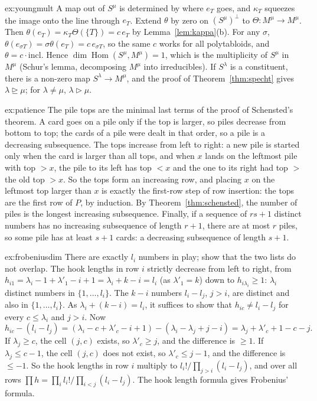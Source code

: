 \begin{solution}{ex:youngmult}
\idea A map out of $S^\mu$ is determined by where $e_T$ goes, and $\kappa_T$ squeezes the image onto the line through $e_T$.
\writeup Extend $\theta$ by zero on $(S^\mu)^\perp$ to $\Theta:M^\mu\to M^\mu$. Then $\theta(e_T)=\kappa_T\Theta(\{T\})=c\,e_T$ by Lemma~\ref{lem:kappa}(b). For any $\sigma$, $\theta(e_{\sigma T})=\sigma\theta(e_T)=c\,e_{\sigma T}$, so the same $c$ works for all
polytabloids, and $\theta=c\cdot\mathrm{incl}$. Hence $\dim\operatorname{Hom}(S^\mu,M^\mu)=1$, which is the multiplicity of $S^\mu$ in $M^\mu$ (Schur's lemma, decomposing $M^\mu$ into irreducibles). If $S^\lambda$ is a constituent, there is a non-zero
map $S^\lambda\to M^\mu$, and the proof of Theorem~\ref{thm:specht} gives $\lambda\trianglerighteq\mu$; for $\lambda\ne\mu$, $\lambda\triangleright\mu$.
\end{solution}

\begin{solution}{ex:patience}
\idea The pile tops are the minimal last terms of the proof of Schensted's theorem.
\writeup A card goes on a pile only if the top is larger, so piles decrease from bottom to top; the cards of a pile were dealt in that order, so a pile is a decreasing subsequence. The tops increase from left to right: a new pile is started only
when the card is larger than all tops, and when $x$ lands on the leftmost pile with top $>x$, the pile to its left has top $<x$ and the one to its right had top $>$ the old top $>x$. So the tops form an increasing row, and placing $x$ on the leftmost
top larger than $x$ is exactly the first-row step of row insertion: the tops are the first row of $P$, by induction. By Theorem~\ref{thm:schensted}, the number of piles is the longest increasing subsequence. Finally, if a sequence of $rs+1$ distinct numbers
has no increasing subsequence of length $r+1$, there are at most $r$ piles, so some pile has at least $s+1$ cards: a decreasing subsequence of length $s+1$.
\end{solution}

\begin{solution}{ex:frobeniusdim}
\idea There are exactly $l_i$ numbers in play; show that the two lists do not overlap.
\writeup The hook lengths in row $i$ strictly decrease from left to right, from $h_{i1}=\lambda_i-1+\lambda'_1-i+1=\lambda_i+k-i=l_i$ (as $\lambda'_1=k$) down to $h_{i\lambda_i}\ge1$: $\lambda_i$ distinct numbers in $\{1,\dots,l_i\}$. The $k-i$ numbers $l_i-l_j$, $j>i$, are distinct
and also in $\{1,\dots,l_i\}$. As $\lambda_i+(k-i)=l_i$, it suffices to show that $h_{ic}\ne l_i-l_j$ for every $c\le\lambda_i$ and $j>i$. Now
\[
h_{ic}-(l_i-l_j)=(\lambda_i-c+\lambda'_c-i+1)-(\lambda_i-\lambda_j+j-i)=\lambda_j+\lambda'_c+1-c-j.
\]
If $\lambda_j\ge c$, the cell $(j,c)$ exists, so $\lambda'_c\ge j$, and the difference is $\ge1$. If $\lambda_j\le c-1$, the cell $(j,c)$ does not exist, so $\lambda'_c\le j-1$, and the difference is $\le-1$. So the hook lengths in row $i$ multiply to
$l_i!/\prod_{j>i}(l_i-l_j)$, and over all rows $\prod h=\prod_il_i!/\prod_{i<j}(l_i-l_j)$. The hook length formula gives Frobenius' formula.
\end{solution}

